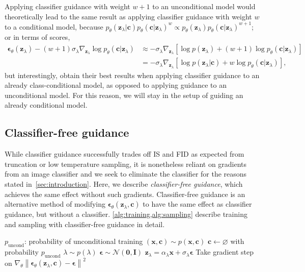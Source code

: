 \documentclass{article} %
\newcommand{\grad}{\nabla}
\newcommand{\bI}{\mathbf{I}}
\newcommand{\bzero}{\mathbf{0}}
\newcommand{\bc}{\mathbf{c}}
\newcommand{\bx}{\mathbf{x}}
\newcommand{\bz}{\mathbf{z}}
\newcommand{\bepsilon}{{\boldsymbol{\epsilon}}}
\begin{document}
Applying classifier guidance with weight $w+1$ to an unconditional model would theoretically lead to the same result as applying classifier guidance with weight $w$ to a conditional model, because $p_{\theta}(\bz_\lambda | \bc)p_{\theta}(\bc | \bz_\lambda)^{w} \propto p_{\theta}(\bz_\lambda)p_{\theta}(\bc | \bz_\lambda)^{w+1}$; or in terms of scores,
\begin{align*}
\bepsilon_\theta(\bz_\lambda) - (w+1)\sigma_{\lambda}\nabla_{\bz_\lambda}\log p_{\theta}(\bc | \bz_\lambda) &\approx -\sigma_{\lambda}\nabla_{\bz_\lambda}[\log p(\bz_\lambda) + (w+1) \log p_{\theta}(\bc | \bz_\lambda) ] \\
&= -\sigma_{\lambda}\nabla_{\bz_\lambda}[\log p(\bz_\lambda|\bc) + w\log p_{\theta}(\bc | \bz_\lambda) ],
\end{align*}
but interestingly, \citeauthor{dhariwal2021diffusion} obtain their best results when applying classifier guidance to an already class-conditional model, as opposed to applying guidance to an unconditional model. For this reason, we will stay in the setup of guiding an already conditional model.

\subsection{Classifier-free guidance}

While classifier guidance successfully trades off IS and FID as expected from truncation or low temperature sampling, it is nonetheless reliant on gradients from an image classifier and we seek to eliminate the classifier for the reasons stated in~\cref{sec:introduction}. Here, we describe \emph{classifier-free guidance}, which achieves the same effect without such gradients. Classifier-free guidance is an alternative method of modifying $\bepsilon_\theta(\bz_\lambda, \bc)$ to have the same effect as classifier guidance, but without a classifier. \cref{alg:training,alg:sampling} describe training and sampling with classifier-free guidance in detail.

\begin{algorithm}[tb]
  \caption{Joint training a diffusion model with classifier-free guidance} \label{alg:training}
  \begin{algorithmic}[1]
    \Require $p_\mathrm{uncond}$: probability of unconditional training
    \Repeat
      \State $(\bx,\bc) \sim p(\bx,\bc)$ 
      \State $\bc \gets \varnothing$ with probability $p_\mathrm{uncond}$ 
      \State $\lambda \sim p(\lambda)$ 
      \State $\bepsilon\sim\mathcal{N}(\bzero,\bI)$
      \State $\bz_\lambda = \alpha_\lambda\bx + \sigma_\lambda \bepsilon$ 
      \State Take gradient step on $\grad_\theta \left\| \bepsilon_\theta(\bz_\lambda,\bc) - \bepsilon \right\|^2$ 
  \end{algorithmic}
\end{algorithm}
\end{document}
